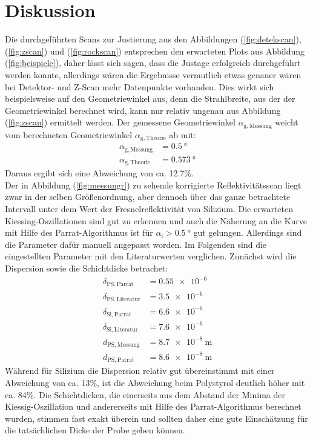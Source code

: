 \section{Diskussion}
\label{sec:Diskussion}
Die durchgeführten Scans zur Justierung aus den Abbildungen (\ref{fig:detekscan}), (\ref{fig:zscan}) und (\ref{fig:rockscan}) entsprechen den erwarteten
Plots aus Abbildung (\ref{fig:beispiele}), daher lässt sich sagen, dass die Justage
erfolgreich durchgeführt werden konnte, allerdings wären die Ergebnisse vermutlich etwas genauer wären bei Detektor- und Z-Scan mehr Datenpunkte vorhanden. Dies wirkt sich beispielsweise auf den Geometriewinkel aus, denn die Strahlbreite, aus der der Geometriewinkel berechnet wird, kann nur relativ ungenau
aus Abbildung (\ref{fig:zscan}) ermittelt werden. Der gemessene Geometriewinkel $\alpha_\mathrm{g,Messung}$ weicht vom berechneten Geometriewinkel $\alpha_\mathrm{g,Theorie}$ ab mit:
\begin{align*}
  \alpha_\mathrm{g,Messung}&= \SI{0.5}{\degree} \\
  \alpha_\mathrm{g,Theorie}&= \SI{0.573}{\degree}
\end{align*}
Daraus ergibt sich eine Abweichung von ca. 12.7\%. \\

\noindent Der in Abbildung (\ref{fig:messungr}) zu sehende korrigierte Reflektivitätsscan liegt zwar in der selben Größenordnung, aber dennoch
über das ganze betrachtete Intervall unter dem Wert der Fresnelreflektivität von Silizium. Die erwarteten Kiessing-Oszillationen sind gut zu erkennen und auch die Näherung an
die Kurve mit Hilfe des Parrat-Algorithmus ist für $\alpha_\mathrm{i}>\SI{0.5}{\degree}$ gut gelungen. Allerdings sind die Parameter dafür manuell angepasst worden. Im Folgenden
sind die eingestellten Parameter mit den Literaturwerten \cite[5]{Anleitung3} verglichen. Zunächst wird die Dispersion sowie die Schichtdicke betrachet:
\begin{align*}
  \delta_\mathrm{PS,Parrat}&= \SI{0.55 e-6}{} \\
  \delta_\mathrm{PS,Literatur}&= \SI{3.5 e-6}{} \\
  \delta_\mathrm{Si,Parrat}&= \SI{6.6 e-6}{} \\
  \delta_\mathrm{Si,Literatur}&= \SI{7.6 e-6}{} \\
  d_\mathrm{PS,Messung}&=\SI{8.7 e-8}{\meter} \\
  d_\mathrm{PS,Parrat}&=\SI{8.6 e-8}{\meter}
\end{align*}
Während für Silizium die Dispersion relativ gut übereinstimmt mit einer Abweichung von ca. 13\%, ist die Abweichung beim Polystyrol deutlich höher mit ca. 84\%.
Die Schichtdicken, die einerseits aus dem Abstand der Minima der Kiessig-Oszillation und andererseits mit Hilfe des Parrat-Algorithmus berechnet wurden, stimmen fast exakt überein und sollten
daher eine gute Einschätzung für die tatsächlichen Dicke der Probe geben können. \\

